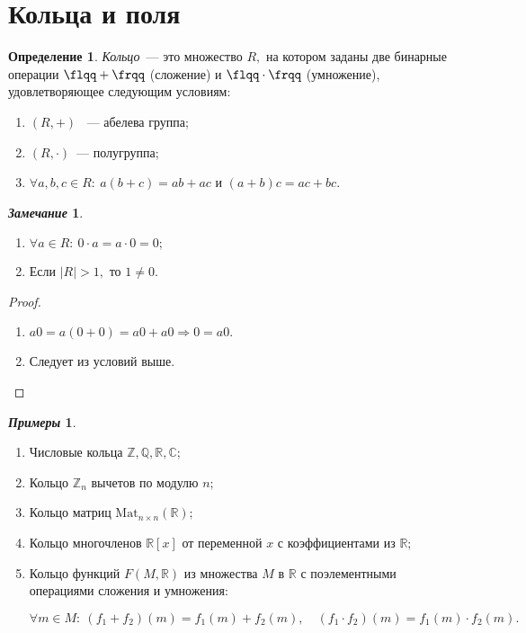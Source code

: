 \documentclass[a4paper, 14pt]{extarticle}
\newcommand{\n}{\par}
\newcommand{\integers}{\mathbb{Z}}
\newcommand{\rationals}{\mathbb{Q}}
\newcommand{\real}{\mathbb{R}}
\newcommand{\complex}{\mathbb{C}}
\theoremstyle{definition}
\newtheorem*{exmpls}{\textit{Примеры}}
\newtheorem*{remark}{\textit{Замечание}}
\newtheorem{definition}{Определение}
\theoremstyle{plain}
\numberwithin{theorem}{section}
\numberwithin{definition}{section}
\numberwithin{statement}{section}
\numberwithin{lemma}{section}
\numberwithin{consequence}{section}
\begin{document}
	\section{Кольца и поля}
	\setcounter{definition}{0}
	\begin{definition}
		\textit{Кольцо}~--- это множество $R,$ на котором заданы две бинарные операции ${\flqq+\frqq}$ (сложение) и ${\flqq \cdot \frqq}$ (умножение), удовлетворяющее следующим условиям:
		\begin{enumerate}
			\setlength\itemsep{0.1em}
			\item $(R, +)$ ~--- абелева группа;
			\item $(R, \cdot)$~--- полугруппа;
			\item $\forall a, b, c \in R{:} \ a(b + c) = ab + ac$ и $(a + b)c = ac + bc.$
		\end{enumerate} 
	\end{definition}
	\begin{remark}
		\
		\begin{enumerate}
			\setlength\itemsep{0.1em}
			\item $\forall a \in R{:} \ 0 \cdot a = a \cdot 0 = 0;$
			\item Если $|R| > 1,$ то $1 \neq 0.$ 
		\end{enumerate}
	\end{remark}
	\begin{proof}
		\
		\begin{enumerate}
			\setlength\itemsep{0.1em}
			\item $a0 = a(0 + 0) = a0 + a0 \Longrightarrow 0 = a0.$
			\item Следует из условий выше. \qedhere
		\end{enumerate}
	\end{proof}
	\begin{exmpls}
		\
		\begin{enumerate}
			\setlength\itemsep{0.1em}
			\item Числовые кольца $\integers, \rationals, \real, \complex;$
			\item Кольцо $\integers_n$ вычетов по модулю $n;$
			\item Кольцо матриц $\mathrm{Mat}_{n \times n}(\real);$
			\item Кольцо многочленов $\real[x]$ от переменной $x$ с коэффициентами из $\real;$
			\item Кольцо функций $F(M, \real)$ из множества $M$ в $\real$ с поэлементными
			операциями сложения и умножения: \n
			$\forall m \in M{:} \ (f_1 + f_2)(m) = f_1(m) + f_2(m), \quad (f_1 \cdot f_2)(m) = f_1(m) \cdot f_2(m).$
		\end{enumerate}
	\end{exmpls}
\end{document}

